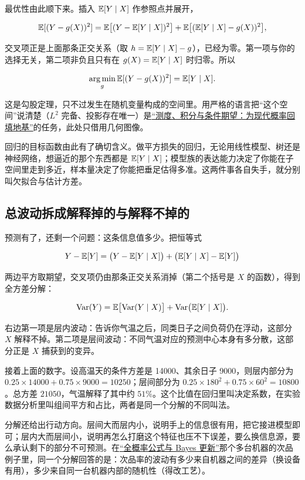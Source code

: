 最优性由此顺下来。插入 \(\mathbb{E}[Y\mid X]\) 作参照点并展开，

\[
\mathbb{E}[(Y-g(X))^2]=\mathbb{E}\bigl[(Y-\mathbb{E}[Y\mid X])^2\bigr]+\mathbb{E}\bigl[(\mathbb{E}[Y\mid X]-g(X))^2\bigr],
\]

交叉项正是上面那条正交关系（取 \(h=\mathbb{E}[Y\mid X]-g\)），已经为零。第一项与你的选择无关，第二项非负且只有在 \(g(X)=\mathbb{E}[Y\mid X]\) 时归零。所以

\[
\operatorname*{arg\,min}_{g}\mathbb{E}[(Y-g(X))^2]=\mathbb{E}[Y\mid X].
\]

这是勾股定理，只不过发生在随机变量构成的空间里。用严格的语言把``这个空间''说清楚（\(L^2\) 完备、投影存在唯一）是\hyperref[ch:101]{``测度、积分与条件期望：为现代概率回填地基''}的任务，此处只借用几何图像。

回归的目标函数由此有了确切含义。做平方损失的回归，无论用线性模型、树还是神经网络，想逼近的那个东西都是 \(\mathbb{E}[Y\mid X]\)；模型族的表达能力决定了你能在子空间里走到多近，样本量决定了你能把垂足估得多准。这两件事各自失手，就分别叫欠拟合与估计方差。

\subsection{总波动拆成解释掉的与解释不掉的}

预测有了，还剩一个问题：这条信息值多少。把恒等式

\[
Y-\mathbb{E}[Y]=\bigl(Y-\mathbb{E}[Y\mid X]\bigr)+\bigl(\mathbb{E}[Y\mid X]-\mathbb{E}[Y]\bigr)
\]

两边平方取期望，交叉项仍由那条正交关系消掉（第二个括号是 \(X\) 的函数），得到全方差分解：

\[
\operatorname{Var}(Y)=\mathbb{E}\bigl[\operatorname{Var}(Y\mid X)\bigr]+\operatorname{Var}\bigl(\mathbb{E}[Y\mid X]\bigr).
\]

右边第一项是层内波动：告诉你气温之后，同类日子之间负荷仍在浮动，这部分 \(X\) 解释不掉。第二项是层间波动：不同气温对应的预测中心本身有多分散，这部分正是 \(X\) 捕获到的变异。

接着上面的数字。设高温天的条件方差是 14000、其余日子 9000，则层内部分为 \(0.25\times14000+0.75\times9000=10250\)；层间部分为 \(0.25\times180^2+0.75\times60^2=10800\)。总方差 \(21050\)，气温解释了其中约 \(51\%\)。这个比值在回归里叫决定系数，在实验数据分析里叫组间平方和占比，两者是同一个分解的不同叫法。

分解还给出行动方向。层间大而层内小，说明手上的信息很有用，把它接进模型即可；层内大而层间小，说明再怎么打磨这个特征也压不下误差，要么换信息源，要么承认剩下的部分不可预测。在\hyperref[sec:05-Probability/02-Conditional-Probability/02]{``全概率公式与 Bayes 更新''}那个多台机器的次品例子里，同一个分解回答的是：次品率的波动有多少来自机器之间的差异（换设备有用），多少来自同一台机器内部的随机性（得改工艺）。

